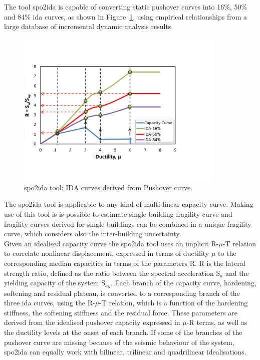 The tool spo2ida \citep{VamvatsikosCornell2005} is capable of converting static pushover curves into 16\%, 50\% and 84\% ida curves, as shown in Figure~\ref{fig:spo2ida}, using empirical relationships from a large database of incremental dynamic analysis results. 

\begin{figure}[!htbp]
\centering
\includegraphics[width=10cm]{./figures/spo2ida.jpg}
\caption{spo2ida tool: IDA curves derived from Pushover curve.}
\label{fig:spo2ida}
\end{figure}

The spo2ida tool is applicable to any kind of multi-linear capacity curve. Making use of this tool is is possible to estimate single building fragility curve and fragility curves derived for single buildings can be combined in a unique fragility curve, which considers also the inter-building uncertainty.\\

Given an idealised capacity curve the spo2ida tool uses an implicit R-$\mu$-T relation to correlate nonlinear displacement, expressed in terms of ductility $\mu$ to the corresponding median capacities in terms of the parameters R. R is the lateral strength ratio, defined as the ratio between the spectral acceleration S$_a$ and the yielding capacity of the system S$_{ay}$. Each branch of the capacity curve, hardening, softening and residual plateau, is converted to a corresponding branch of the three ida curves, using the R-$\mu$-T relation, which is a function of the hardening stiffness, the softening stiffness and the residual force. These parameters are derived from the idealised pushover capacity expressed in $\mu$-R terms, as well as the ductility levels at the onset of each branch. If some of the branches of the pushover curve are missing because of the seismic behaviour of the system, spo2ida can equally work with bilinear, trilinear and quadrilinear idealisations.\\

